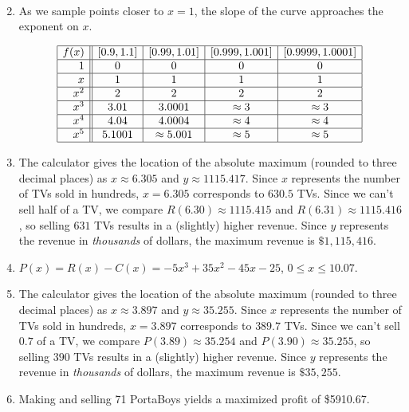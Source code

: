 \documentclass{ximera}
\begin{document}
\begin{enumerate}
\[\begin{array}{|r||c|c|c|c|c|c|}
\end{array} \]


\item As we sample points closer to $x=1$, the slope of the curve approaches the exponent on $x$.

\[ \begin{array}{|r||c|c|c|c|}  \hline

 f(x) &  [0.9, 1.1] & [0.99, 1.01] &[0.999, 1.001] & [0.9999, 1.0001]  \\ \hline
 1 &  0 &   0  & 0   & 0   \\  \hline
 x &  1 &   1  & 1   & 1   \\  \hline
 x^2 & 2 & 2 & 2 & 2  \\  \hline
 x^3 & 3.01  & 3.0001 & \approx 3 & \approx 3  \\  \hline
 x^4&  4.04 & 4.0004 & \approx 4 & \approx 4 \\ \hline
 x^5 & 5.1001 & \approx 5.001 & \approx 5 & \approx 5  \\ \hline

\end{array} \]


\item The calculator gives the location  of the absolute maximum (rounded to three decimal places) as $x \approx 6.305$ and $y \approx 1115.417$.  Since $x$ represents the number of TVs sold in hundreds, $x = 6.305$ corresponds to $630.5$ TVs.  Since we can't sell half of a TV, we compare $R(6.30) \approx 1115.415$ and $R(6.31) \approx 1115.416$, so selling $631$ TVs results in a (slightly) higher revenue.  Since $y$ represents the revenue in \textit{thousands} of dollars, the maximum revenue is $\$ 1,\!115,\!416$.

\item $P(x) = R(x) - C(x) = -5x^3+35x^2-45x-25$, $0 \leq x \leq 10.07$.

\item  The calculator gives the location  of the absolute maximum (rounded to three decimal places) as $x \approx 3.897$ and $y \approx 35.255$.  Since $x$ represents the number of TVs sold in hundreds, $x = 3.897$ corresponds to $389.7$ TVs.  Since we can't sell $0.7$ of a TV, we compare $P(3.89) \approx 35.254$ and $P(3.90) \approx 35.255$, so selling $390$ TVs results in a (slightly) higher revenue.  Since $y$ represents the revenue in \textit{thousands} of dollars, the maximum revenue is $\$ 35,\!255$.

\item Making and selling 71 PortaBoys yields a maximized profit of \$5910.67.



\end{enumerate}
\end{document}
